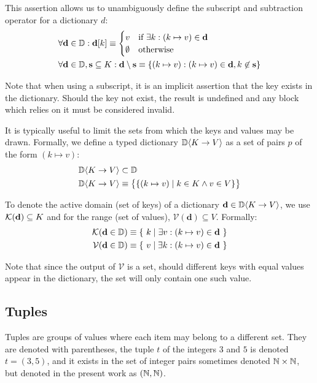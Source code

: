 This assertion allows us to unambiguously define the subscript and subtraction operator for a dictionary $d$:
\begin{align}
  \forall \mathbf{d} \in \mathbb{D}&: \mathbf{d}[k] \equiv \begin{cases}
    v & \text{if}\ \exists k : (k \mapsto v) \in \mathbf{d} \\
    \emptyset & \text{otherwise}
  \end{cases}\\
  \forall \mathbf{d} \in \mathbb{D}&, \mathbf{s} \subseteq K: \mathbf{d} \setminus \mathbf{s} \equiv \{ (k \mapsto v): (k \mapsto v) \in \mathbf{d}, k \not \in \mathbf{s} \}
\end{align}

Note that when using a subscript, it is an implicit assertion that the key exists in the dictionary. Should the key not exist, the result is undefined and any block which relies on it must be considered invalid.

It is typically useful to limit the sets from which the keys and values may be drawn. Formally, we define a typed dictionary $\mathbb{D}\langle K\to V\rangle$ as a set of pairs $p$ of the form $(k \mapsto v)$:
\begin{align}
  \mathbb{D}\langle K\to V\rangle &\subset \mathbb{D} \\
  \mathbb{D}\langle K\to V\rangle &\equiv \big \{ \{ (k \mapsto v) \mid k \in K \wedge v \in V \} \big \}
\end{align}

To denote the active domain (\ie set of keys) of a dictionary $\mathbf{d} \in \mathbb{D}\langle K\to V\rangle$, we use $\mathcal{K}(\mathbf{d}) \subseteq K$ and for the range (\ie set of values), $\mathcal{V}(\mathbf{d}) \subseteq V$. Formally:
\begin{align}
  \mathcal{K}(\mathbf{d} \in \mathbb{D}) &\equiv \{\ k \mid \exists v : (k \mapsto v) \in \mathbf{d}\ \} \\
  \mathcal{V}(\mathbf{d} \in \mathbb{D}) &\equiv \{\ v \mid \exists k : (k \mapsto v) \in \mathbf{d}\ \}
\end{align}

Note that since the output of $\mathcal{V}$ is a set, should different keys with equal values appear in the dictionary, the set will only contain one such value.

\subsection{Tuples}\label{sec:tuples}

Tuples are groups of values where each item may belong to a different set. They are denoted with parentheses, \eg the tuple $t$ of the integers $3$ and $5$ is denoted $t = (3, 5)$, and it exists in the set of integer pairs sometimes denoted $\mathbb{N} \times \mathbb{N}$, but denoted in the present work as $(\mathbb{N}, \mathbb{N})$.

